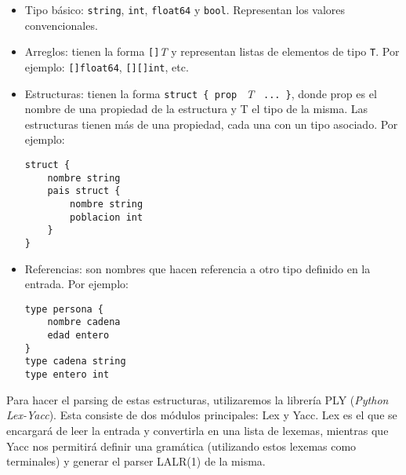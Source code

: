 \begin{itemize}
    \item Tipo básico: \texttt{string}, \texttt{int}, \texttt{float64} y \texttt{bool}. Representan los valores convencionales.
    \item Arreglos: tienen la forma \texttt{[]}\textit{T} y representan listas de elementos de tipo \texttt{T}. Por ejemplo: \texttt{[]float64}, \texttt{[][]int}, etc. 
    \item Estructuras: tienen la forma \texttt{struct \{ prop } \textit{T} \texttt{ ... \}}, donde prop es el nombre de una propiedad de la estructura y T el tipo de la misma. Las estructuras tienen más de una propiedad, cada una con un tipo asociado. Por ejemplo:
    \begin{verbatim}
struct {
    nombre string
    pais struct {
        nombre string
        poblacion int
    }
}
    \end{verbatim}
    \item Referencias: son nombres que hacen referencia a otro tipo definido en la entrada. Por ejemplo:
    \begin{verbatim}
type persona {
    nombre cadena
    edad entero
}
type cadena string
type entero int
    \end{verbatim}
\end{itemize}

Para hacer el parsing de estas estructuras, utilizaremos la librería PLY (\textit{Python Lex-Yacc}). Esta consiste de dos módulos principales: Lex y Yacc. Lex es el que se encargará de leer la entrada y convertirla en una lista de lexemas, mientras que Yacc nos permitirá definir una gramática (utilizando estos lexemas como terminales) y generar el parser LALR(1) de la misma.
